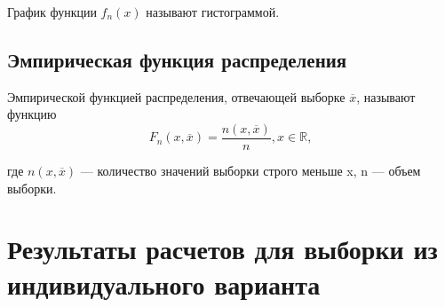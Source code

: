 \documentclass[a4paper, 14pt, unknownkeysallowed]{extreport}
\begin{document}
\begin{definition}
	График функции $f_{n}(x)$ называют гистограммой.
\end{definition}

\section{Эмпирическая функция распределения}
\begin{definition}
	Эмпирической функцией распределения, отвечающей выборке $\overline{x}$, называют функцию\\
	\begin{equation}
	F_n(x, \overline{x}) = \frac{n(x,\overline{x})}{n}, x\in\mathbb{R},
	\end{equation}
\end{definition}
	где $n(x,\overline{x})$ --- количество значений выборки строго меньше x, n --- объем выборки.

%
%
\chapter{Результаты расчетов для выборки из индивидуального варианта}
\end{document}
